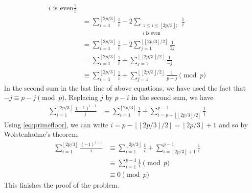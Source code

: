 \documentclass{subfile}
\begin{document}
\begin{solution}
\begin{align*}
{{							i\text{ is even}}}\frac {1}{i} \\
					&= \sum_{i = 1}^{\left\lfloor 2p/3\right\rfloor}\frac {1}{i} - 2\sum_{\substack{1\leq i\leq \left\lfloor 2p/3\right\rfloor ; \\
							i\text{ is even}}}\frac {1}{i}\\
					&= \sum_{i = 1}^{\left\lfloor 2p/3\right\rfloor}\frac {1}{i} - 2\sum_{j = 1}^{\left\lfloor \left\lfloor 2p/3\right\rfloor /2\right\rfloor}\frac {1}{2j} \\
					&= \sum_{i = 1}^{\left\lfloor 2p/3\right\rfloor}\frac {1}{i} + \sum_{j = 1}^{\left\lfloor \left\lfloor 2p/3\right\rfloor /2\right\rfloor}\frac {1}{ - j}\\
					&\equiv\sum_{i = 1}^{\left\lfloor 2p/3\right\rfloor}\frac {1}{i} + \sum_{j = 1}^{\left\lfloor \left\lfloor 2p/3\right\rfloor /2\right\rfloor}\frac {1}{p - j} \pmod p
			\end{align*}
		In the second sum in the last line of above equations, we have used the fact that $-j \equiv p-j \pmod p$. Replacing $ j$ by $ p - i$ in the second sum, we have
		\begin{align*}
		\sum_{i = 1}^{\left\lfloor 2p/3\right\rfloor}\frac {\left( - 1\right)^{i - 1}}{i} &\equiv \sum_{i = 1}^{\left\lfloor 2p/3\right\rfloor}\frac {1}{i} + \sum_{i = p - \left\lfloor \left\lfloor 2p/3\right\rfloor /2\right\rfloor}^{p - 1}\frac {1}{i}
		\end{align*}
		Using \eqref{eq:primefloor}, we can write $i = p - \left\lfloor \left\lfloor 2p/3\right\rfloor /2\right\rfloor = \left\lfloor 2p/3\right\rfloor + 1$ and so by Wolstenholme's theorem,
		\begin{align*}
		\sum_{i = 1}^{\left\lfloor 2p/3\right\rfloor}\frac {\left( - 1\right)^{i - 1}}{i}  &\equiv \sum_{i = 1}^{\left\lfloor 2p/3\right\rfloor}\frac {1}{i} + \sum_{i = \left\lfloor 2p/3\right\rfloor + 1}^{p - 1}\frac {1}{i}\\
		&\equiv \sum_{i = 1}^{p - 1}\frac {1}{i}\pmod p\\
		&\equiv 0 \pmod p
		\end{align*}
		This finishes the proof of the problem.
	\end{solution}
\end{document}
